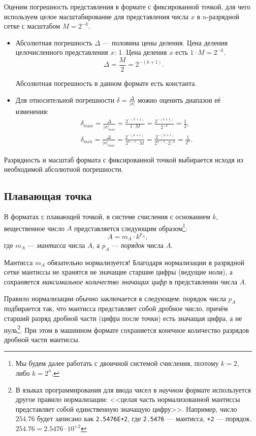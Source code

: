 Оценим погрешность представления в формате с фиксированной точкой, для чего используем целое масштабирование для представления числа $x$ в $n$-разрядной сетке с масштабом $M=2^{-k}$. 

\begin{itemize}
    \item Абсолютная погрешность $\Delta$ --- половина цены деления. Цена деления целочисленного представления $x$: 1. Цена деления $x$ есть $1\cdot M=2^{-k}$.
    \[
        \Delta=\frac{M}{2}=2^{-(k+1)}.
    \]
    
    Абсолютная погрешность в данном формате есть константа.
    
    \item Для относительной погрешности $\delta=\frac{\Delta}{|x|}$ можно оценить диапазон её изменения:
    \begin{align*}
        &\delta_{max}=\frac{\Delta}{|x|_{min}}=\frac{2^{-(k+1)}}{1\cdot M}=\frac{2^{-(k+1)}}{2^{-k}}=\frac{1}{2}, \\
        &\delta_{min}=\frac{\Delta}{|x|_{max}}=\frac{2^{-(k+1)}}{2^{n-1}\cdot M}=\frac{2^{-(k+1)}}{2^{n-1}\cdot 2^{-k}}=\frac{1}{2^n}. 
    \end{align*}
\end{itemize}

Разрядность и масштаб формата с фиксированной точкой выбирается исходя из необходимой абсолютной погрешности.


\subsection{Плавающая точка}

В форматах с плавающей точкой, в системе счисления с основанием $k$, вещественное число $A$ представляется следующим образом\footnote{Мы будем далее работать с двоичной системой счисления, поэтому $k=2$, либо $k=2^n$.}:
\[A=m_A\cdot k^{p_A},\]
где $m_A$ --- \emph{мантисса} числа $A$, а $p_A$ --- \emph{порядок} числа $A$. 

Мантисса $m_A$ обязательно нормализуется! Благодаря нормализации в разрядной сетке мантиссы не хранятся не значащие старшие цифры (ведущие ноли), а сохраняется \emph{максимальное количество значащих цифр} в представлении числа $A$.

Правило нормализации обычно заключается в следующем: порядок числа $p_A$ подбирается так, что мантисса представляет собой дробное число, причём старший разряд дробной части (цифра после точки) есть значащая цифра, а не нуль\footnote{В языках программирования для ввода чисел в \emph{научном} формате используется другое правило нормализации: <<целая часть нормализованной мантиссы представляет собой единственную значащую цифру>>. Например, число $254.76$ будет записано как \verb"2.5476E+2", где \verb"2.5476" --- мантисса, \verb"+2" --- порядок. $254.76=2.5476\cdot 10^{+2}$}. При этом в машинном формате сохраняется конечное количество разрядов дробной части мантиссы. 

